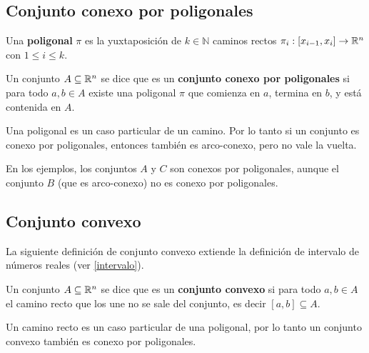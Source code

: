 \subsection{Conjunto conexo por poligonales}

\begin{definition}[Poligonal]
Una \textbf{poligonal} $\pi$ es la yuxtaposición de $k \in \mathbb{N}$ caminos rectos $\pi_i : [x_{i-1}, x_i] \to \mathbb{R}^n$ con $1 \leq i \leq k$. 
\end{definition}

\begin{definition}
Un conjunto $A \subseteq \mathbb{R}^n$ se dice que es un \textbf{conjunto conexo por poligonales} si para todo $a, b \in A$ existe una poligonal $\pi$ que comienza en $a$, termina en $b$, y está contenida en $A$.
\end{definition}

\begin{observation}
Una poligonal es un caso particular de un camino.  Por lo tanto si un conjunto es conexo por poligonales, entonces también es arco-conexo, pero no vale la vuelta.
\end{observation}

\begin{example}
En los ejemplos, los conjuntos $A$ y $C$ son conexos por poligonales, aunque el conjunto $B$ (que es arco-conexo) no es conexo por poligonales.
\end{example}

\subsection{Conjunto convexo}

La siguiente definición de conjunto convexo extiende la definición de intervalo de números reales (ver \ref{intervalo}).

\begin{definition}[Convexo] \label{convexo}
Un conjunto $A \subseteq \mathbb{R}^n$ se dice que es un \textbf{conjunto convexo}  si para todo $a, b \in A$ el camino recto que los une no se sale del conjunto, es decir $[a,b] \subseteq A$.
\end{definition}

\begin{observation}
Un camino recto es un caso particular de una poligonal, por lo tanto un conjunto convexo también es conexo por poligonales.
\end{observation}


